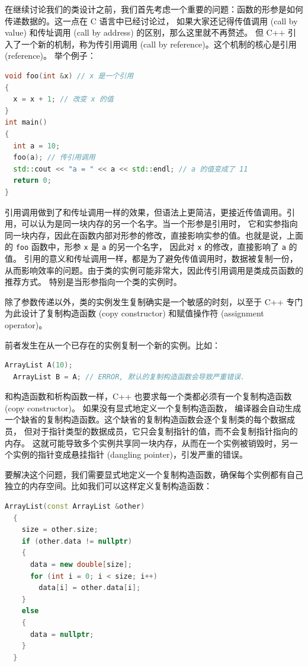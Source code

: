 \documentclass[a4paper]{ctexart}
\theoremstyle{definition}
\theoremstyle{definition}
\begin{document}
在继续讨论我们的类设计之前，我们首先考虑一个重要的问题：函数的形参是如何传递数据的。这一点在 C 语言中已经讨论过，
如果大家还记得传值调用 (call by value) 和传址调用 (call by address) 的区别，那么这里就不再赘述。
但 C++ 引入了一个新的机制，称为传引用调用 (call by reference)。这个机制的核心是引用 (reference)。
举个例子：
\begin{lstlisting}[language=C++]
void foo(int &x) // x 是一个引用
{
  x = x + 1; // 改变 x 的值
}
int main()
{
  int a = 10;
  foo(a); // 传引用调用
  std::cout << "a = " << a << std::endl; // a 的值变成了 11
  return 0;
}
\end{lstlisting}
引用调用做到了和传址调用一样的效果，但语法上更简洁，更接近传值调用。引用，可以认为是同一块内存的另一个名字。当一个形参是引用时，
它和实参指向同一块内存，因此在函数内部对形参的修改，直接影响实参的值。也就是说，上面的 \verb|foo| 函数中，形参 \verb|x| 是 \verb|a| 的另一个名字，
因此对 \verb|x| 的修改，直接影响了 \verb|a| 的值。
引用的意义和传址调用一样，都是为了避免传值调用时，数据被复制一份，从而影响效率的问题。由于类的实例可能非常大，因此传引用调用是类成员函数的推荐方式。
特别是当形参指向一个类的实例时。

除了参数传递以外，类的实例发生复制确实是一个敏感的时刻，以至于 C++ 专门为此设计了复制构造函数 (copy constructor) 和赋值操作符 (assignment operator)。

前者发生在从一个已存在的实例复制一个新的实例。比如：
\begin{lstlisting}[language=C++]
  ArrayList A(10);
  ArrayList B = A; // ERROR, 默认的复制构造函数会导致严重错误.
\end{lstlisting}
和构造函数和析构函数一样，C++ 也要求每一个类都必须有一个复制构造函数 (copy constructor)。 如果没有显式地定义一个复制构造函数，
编译器会自动生成一个缺省的复制构造函数。这个缺省的复制构造函数会逐个复制类的每个数据成员，
但对于指针类型的数据成员，它只会复制指针的值，而不会复制指针指向的内存。
这就可能导致多个实例共享同一块内存，从而在一个实例被销毁时，另一个实例的指针变成悬挂指针 (dangling pointer)，引发严重的错误。

要解决这个问题，我们需要显式地定义一个复制构造函数，确保每个实例都有自己独立的内存空间。比如我们可以这样定义复制构造函数：
\begin{lstlisting}[language=C++]
  ArrayList(const ArrayList &other)
  {
    size = other.size;
    if (other.data != nullptr)
    {
      data = new double[size];
      for (int i = 0; i < size; i++)
        data[i] = other.data[i];
    }
    else
    {
      data = nullptr;
    }
  }
\end{lstlisting}
\end{document}
